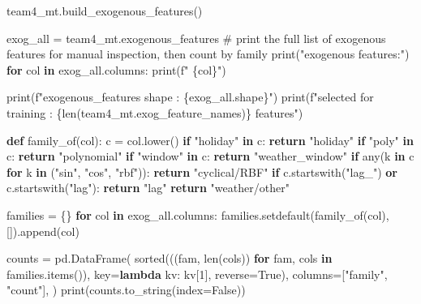 \documentclass[
  english,
  letterpaper,
]{scrbook}
\newenvironment{Shaded}{\begin{snugshade}}{\end{snugshade}}
\newcommand{\BuiltInTok}[1]{\textcolor[rgb]{0.00,0.23,0.31}{#1}}
\newcommand{\CommentTok}[1]{\textcolor[rgb]{0.37,0.37,0.37}{#1}}
\newcommand{\ControlFlowTok}[1]{\textcolor[rgb]{0.00,0.23,0.31}{\textbf{#1}}}
\newcommand{\DecValTok}[1]{\textcolor[rgb]{0.68,0.00,0.00}{#1}}
\newcommand{\KeywordTok}[1]{\textcolor[rgb]{0.00,0.23,0.31}{\textbf{#1}}}
\newcommand{\NormalTok}[1]{\textcolor[rgb]{0.00,0.23,0.31}{#1}}
\newcommand{\OperatorTok}[1]{\textcolor[rgb]{0.37,0.37,0.37}{#1}}
\newcommand{\SpecialCharTok}[1]{\textcolor[rgb]{0.37,0.37,0.37}{#1}}
\newcommand{\SpecialStringTok}[1]{\textcolor[rgb]{0.13,0.47,0.30}{#1}}
\newcommand{\StringTok}[1]{\textcolor[rgb]{0.13,0.47,0.30}{#1}}
\newcommand{\VariableTok}[1]{\textcolor[rgb]{0.07,0.07,0.07}{#1}}
\begin{document}
\protect{}\label{team4-build-exog}
\begin{Shaded}
\begin{Highlighting}[]
\NormalTok{team4\_mt.build\_exogenous\_features()}

\NormalTok{exog\_all }\OperatorTok{=}\NormalTok{ team4\_mt.exogenous\_features}
\CommentTok{\# print the full list of exogenous features for manual inspection, then count by family}
\BuiltInTok{print}\NormalTok{(}\StringTok{"exogenous features:"}\NormalTok{)}
\ControlFlowTok{for}\NormalTok{ col }\KeywordTok{in}\NormalTok{ exog\_all.columns:}
    \BuiltInTok{print}\NormalTok{(}\SpecialStringTok{f"  }\SpecialCharTok{\{}\NormalTok{col}\SpecialCharTok{\}}\SpecialStringTok{"}\NormalTok{)}
    
\BuiltInTok{print}\NormalTok{(}\SpecialStringTok{f"exogenous\_features shape : }\SpecialCharTok{\{}\NormalTok{exog\_all}\SpecialCharTok{.}\NormalTok{shape}\SpecialCharTok{\}}\SpecialStringTok{"}\NormalTok{)}
\BuiltInTok{print}\NormalTok{(}\SpecialStringTok{f"selected for training    : }\SpecialCharTok{\{}\BuiltInTok{len}\NormalTok{(team4\_mt.exog\_feature\_names)}\SpecialCharTok{\}}\SpecialStringTok{ features"}\NormalTok{)}

\KeywordTok{def}\NormalTok{ family\_of(col):}
\NormalTok{    c }\OperatorTok{=}\NormalTok{ col.lower()}
    \ControlFlowTok{if} \StringTok{"holiday"} \KeywordTok{in}\NormalTok{ c:}
        \ControlFlowTok{return} \StringTok{"holiday"}
    \ControlFlowTok{if} \StringTok{"poly"} \KeywordTok{in}\NormalTok{ c:}
        \ControlFlowTok{return} \StringTok{"polynomial"}
    \ControlFlowTok{if} \StringTok{"window"} \KeywordTok{in}\NormalTok{ c:}
        \ControlFlowTok{return} \StringTok{"weather\_window"}
    \ControlFlowTok{if} \BuiltInTok{any}\NormalTok{(k }\KeywordTok{in}\NormalTok{ c }\ControlFlowTok{for}\NormalTok{ k }\KeywordTok{in}\NormalTok{ (}\StringTok{"sin"}\NormalTok{, }\StringTok{"cos"}\NormalTok{, }\StringTok{"rbf"}\NormalTok{)):}
        \ControlFlowTok{return} \StringTok{"cyclical/RBF"}
    \ControlFlowTok{if}\NormalTok{ c.startswith(}\StringTok{"lag\_"}\NormalTok{) }\KeywordTok{or}\NormalTok{ c.startswith(}\StringTok{"lag"}\NormalTok{):}
        \ControlFlowTok{return} \StringTok{"lag"}
    \ControlFlowTok{return} \StringTok{"weather/other"}

\NormalTok{families }\OperatorTok{=}\NormalTok{ \{\}}
\ControlFlowTok{for}\NormalTok{ col }\KeywordTok{in}\NormalTok{ exog\_all.columns:}
\NormalTok{    families.setdefault(family\_of(col), []).append(col)}

\NormalTok{counts }\OperatorTok{=}\NormalTok{ pd.DataFrame(}
    \BuiltInTok{sorted}\NormalTok{(((fam, }\BuiltInTok{len}\NormalTok{(cols)) }\ControlFlowTok{for}\NormalTok{ fam, cols }\KeywordTok{in}\NormalTok{ families.items()),}
\NormalTok{           key}\OperatorTok{=}\KeywordTok{lambda}\NormalTok{ kv: kv[}\DecValTok{1}\NormalTok{], reverse}\OperatorTok{=}\VariableTok{True}\NormalTok{),}
\NormalTok{    columns}\OperatorTok{=}\NormalTok{[}\StringTok{"family"}\NormalTok{, }\StringTok{"count"}\NormalTok{],}
\NormalTok{)}
\BuiltInTok{print}\NormalTok{(counts.to\_string(index}\OperatorTok{=}\VariableTok{False}\NormalTok{))}
\end{Highlighting}
\end{Shaded}
\end{document}
